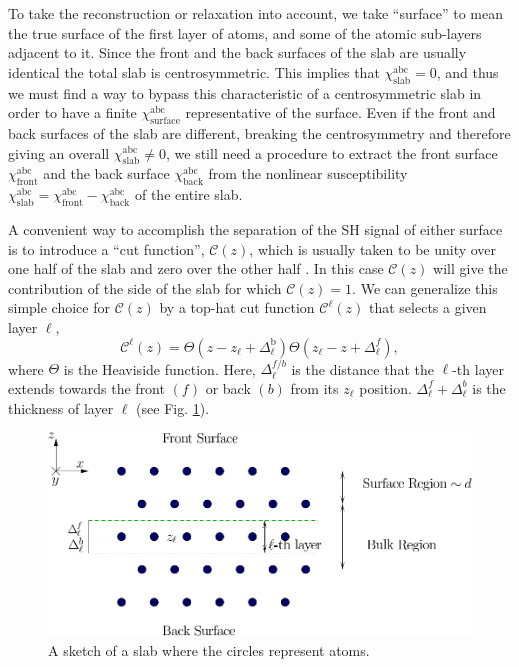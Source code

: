 To take the reconstruction or relaxation into account, we take ``surface'' to
mean the true surface of the first layer of atoms, and some of the atomic
sub-layers adjacent to it. Since the front and the back surfaces of the slab are
usually identical the total slab is centrosymmetric. This implies that
$\chi^{\mathrm{abc}}_{\mathrm{slab}} = 0$, and thus we must find a way to bypass
this characteristic of a centrosymmetric slab in order to have a finite
$\chi^{\mathrm{abc}}_{\mathrm{surface}}$ representative of the surface. Even if the front and
back surfaces of the slab are different, breaking the centrosymmetry and
therefore giving an overall $\chi^{\mathrm{abc}}_{\mathrm{slab}}\ne 0$, we still
need a procedure to extract the front surface $\chi^{\mathrm{abc}}_{\mathrm{front}}$ and the
back surface $\chi^{\mathrm{abc}}_{\mathrm{back}}$ from the nonlinear susceptibility $\chi^{\mathrm{abc}}_{\mathrm{slab}} = \chi^{\mathrm{abc}}_{\mathrm{front}} - \chi^{\mathrm{abc}}_{\mathrm{back}}$ of the
entire slab.

A convenient way to accomplish the separation of the SH signal of either surface
is to introduce a ``cut function'', $\mathcal{C}(z)$, which is usually taken to be
unity over one half of the slab and zero over the other half \cite{reiningPRB94}.
In this case $\mathcal{C}(z)$ will give the contribution of the side of the slab for
which $\mathcal{C}(z)=1$. We can generalize this simple choice for $\mathcal{C}(z)$ by a
top-hat cut function $\mathcal{C}^{\ell}(z)$ that selects a given layer $\ell$,
\begin{equation}
\label{sz}
\mathcal{C}^{\ell}(z)=\Theta(z-z_\ell+\Delta_\ell^{\mathrm{b}})
            \Theta(z_\ell-z+\Delta_\ell^f),
\end{equation}
where $\Theta$ is the Heaviside function. Here, $\Delta_\ell^{f/b}$
is the distance that the $\ell$-th layer extends towards the front
$(f)$ or back $(b)$ from its $z_\ell$ position. 
$\Delta_\ell^f+\Delta_\ell^b$ is the thickness of layer $\ell$ 
(see Fig. \ref{fslab}).
\begin{figure}[b]
\centering
\includegraphics[scale=.7]{content/figures/diag-slab}
\caption{A sketch of a slab where the circles represent atoms.\label{fslab}}
\end{figure}

